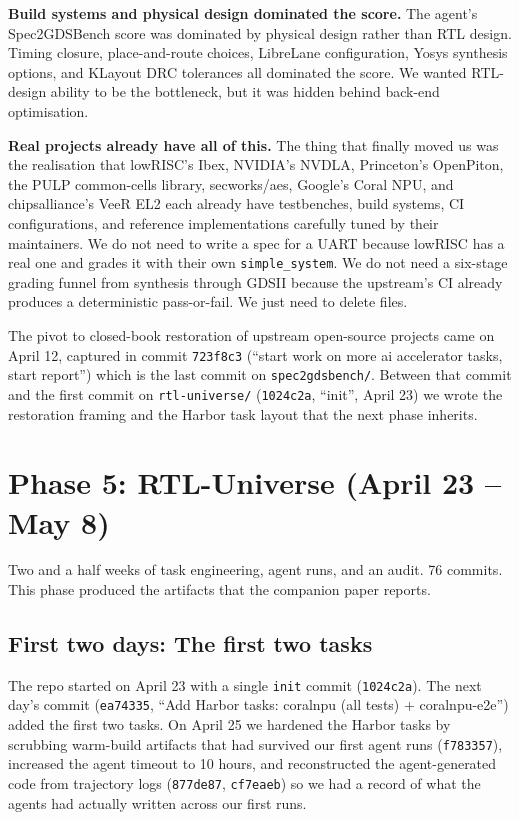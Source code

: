 \documentclass{article}
\begin{document}
\textbf{Build systems and physical design dominated the score.} The agent's Spec2GDSBench
score was dominated by physical design rather than RTL design. Timing closure,
place-and-route choices, LibreLane configuration, Yosys synthesis options, and KLayout
DRC tolerances all dominated the score. We wanted RTL-design ability to be the
bottleneck, but it was hidden behind back-end optimisation.

\textbf{Real projects already have all of this.} The thing that finally moved us was the
realisation that lowRISC's Ibex, NVIDIA's NVDLA, Princeton's OpenPiton, the PULP
common-cells library, secworks/aes, Google's Coral NPU, and chipsalliance's VeeR EL2 each
already have testbenches, build systems, CI configurations, and reference implementations
carefully tuned by their maintainers. We do not need to write a spec for a UART because
lowRISC has a real one and grades it with their own \texttt{simple\_system}. We do not
need a six-stage grading funnel from synthesis through GDSII because the upstream's CI
already produces a deterministic pass-or-fail. We just need to delete files.

The pivot to closed-book restoration of upstream open-source projects came on April 12,
captured in commit \texttt{723f8c3} (``start work on more ai accelerator tasks, start
report'') which is the last commit on \texttt{spec2gdsbench/}. Between that commit and the
first commit on \texttt{rtl-universe/} (\texttt{1024c2a}, ``init'', April 23) we wrote the
restoration framing and the Harbor task layout that the next phase inherits.

\section{Phase 5: RTL-Universe (April 23 -- May 8)}
\label{sec:rtl-universe}

Two and a half weeks of task engineering, agent runs, and an audit. 76 commits.
This phase produced the artifacts that the companion paper reports.

\subsection{First two days: The first two tasks}

The repo started on April 23 with a single \texttt{init} commit (\texttt{1024c2a}). The
next day's commit (\texttt{ea74335}, ``Add Harbor tasks: coralnpu (all tests) +
coralnpu-e2e'') added the first two tasks. On April 25 we hardened the Harbor tasks by
scrubbing warm-build artifacts that had survived our first agent runs (\texttt{f783357}),
increased the agent timeout to 10 hours, and reconstructed the agent-generated code from
trajectory logs (\texttt{877de87}, \texttt{cf7eaeb}) so we had a record of what the agents
had actually written across our first runs.
\end{document}
